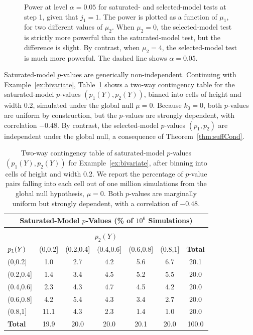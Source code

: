 \documentclass{article}
\begin{document}
\begin{figure}
\begin{subfigure}[t]{.4\textwidth}
  \end{subfigure}
  \caption{Power at level $\alpha=0.05$ for saturated- and selected-model tests at step 1, given that $j_1=1$. The power is plotted as a function of $\mu_1$, for two different values of $\mu_2$. When $\mu_2=0$, the selected-model test is strictly more powerful than the saturated-model test, but the difference is slight. By contrast, when $\mu_2=4$, the selected-model test is much more powerful. The dashed line shows $\alpha=0.05$.}
   \label{fig:bv_powCurves}
\end{figure}

Saturated-model $p$-values are generically non-independent. Continuing with Example~\ref{ex:bivariate}, Table~\ref{tab:bv_twoWayTable} shows a two-way contingency table for the saturated-model $p$-values $(p_1(Y), p_2(Y))$, binned into cells of height and width 0.2, simulated under the global null $\mu=0$. Because $k_0=0$, both $p$-values are uniform by construction, but the $p$-values are strongly dependent, with correlation $-0.48$. By contrast, the selected-model $p$-values $(p_1,p_2)$ are independent under the global null, a consequence of Theorem~\ref{thm:suffCond}.

\begin{table}[ht]
  \centering
  \begin{tabular}{l|ccccc|c}
    \multicolumn{7}{c}{Saturated-Model $p$-Values 
      (\% of $10^6$ Simulations)}\\[7pt]
    \hline
    \multicolumn{7}{c}{}\\[-1.5ex]
    \multicolumn{7}{c}{$p_2(Y)$}\\[5pt]
    ${\large p_1(Y)}$ & (0,0.2] & (0.2,0.4] & (0.4,0.6] & (0.6,0.8] & (0.8,1] & \textbf{Total} \\ 
    \hline
    (0,0.2] & 1.0 & 2.7 & 4.2 & 5.6 & 6.7 & 20.1 \\ 
    (0.2,0.4] & 1.4 & 3.4 & 4.5 & 5.2 & 5.5 & 20.0 \\ 
    (0.4,0.6] & 2.3 & 4.3 & 4.7 & 4.5 & 4.2 & 20.0 \\ 
    (0.6,0.8] & 4.2 & 5.4 & 4.3 & 3.4 & 2.7 & 20.0 \\ 
    (0.8,1] & 11.1 & 4.3 & 2.3 & 1.4 & 1.0 & 20.0 \\ 
    \hline
    \textbf{Total} & 19.9 & 20.0 & 20.0 & 20.1 & 20.0 & 100.0 \\ 
    \hline
  \end{tabular}
  \caption{Two-way contingency table of saturated-model $p$-values $(p_1(Y), p_2(Y))$ for Example~\ref{ex:bivariate}, after binning into cells of height and width 0.2. We report the percentage of $p$-value pairs falling into each cell out of one million simulations from the global null hypothesis, $\mu=0$. Both $p$-values are marginally uniform but strongly dependent, with a correlation of $-0.48$.}
\label{tab:bv_twoWayTable}
\end{table}
\end{document}
